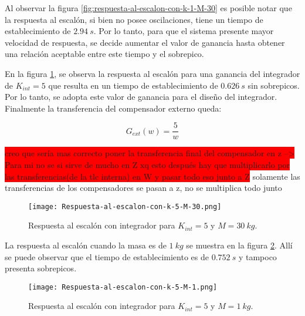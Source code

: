 Al observar la figura \ref{fig:respuesta-al-escalon-con-k-1-M-30} es posible notar que la respuesta al escalón, si bien no posee oscilaciones, tiene un tiempo de establecimiento de  $2.94\:s$. Por lo tanto, para que el sistema presente mayor velocidad de respuesta, se decide aumentar el valor de ganancia hasta obtener una relación aceptable entre este tiempo y el sobrepico.

En la figura \ref{fig:respuesta-al-escalon-con-k-5-M-30}, se observa la respuesta al escalón para una ganancia del integrador de $K_{int}=5$ que resulta en un tiempo de establecimiento de $0.626\:s$ sin sobrepicos. Por lo tanto, se adopta este valor de ganancia para el diseño del integrador. Finalmente la transferencia del compensador externo queda:

\begin{equation} \label{eq_gexterno_dig}
	G_{ext}(w)=\frac{5}{w}	
\end{equation}

\colorbox{red}{creo que sería mas correcto poner la transferencia final del compensador en z --> Para mi no se si sirve de mucho en Z xq esto después hay que multiplicarlo por las transferencias(de la tlc interna) en W y pasar todo eso junto a Z} solamente las transferencias de los compensadores se pasan a z, no se multiplica todo junto

\begin{figure}[H]
	\centering
	\texttt{[image: Respuesta-al-escalon-con-k-5-M-30.png]}
	\caption{Respuesta al escalón con integrador para $K_{int} =5$ y $M = 30\:kg$.}
	\label{fig:respuesta-al-escalon-con-k-5-M-30}
\end{figure}






 La respuesta al escal\'{o}n cuando la masa es de $1\:kg$ se muestra en la figura \ref{fig:respuesta-al-escalon-con-k-5-M-1}. Allí se puede observar que el tiempo de establecimiento es de $0.752\:s$ y tampoco presenta sobrepicos.



\begin{figure}[H]
	\centering
	\texttt{[image: Respuesta-al-escalon-con-k-5-M-1.png]}
	\caption{Respuesta al escalón con integrador para $K_{int} =5$ y $M=1\:kg$.}
	\label{fig:respuesta-al-escalon-con-k-5-M-1}
\end{figure}

